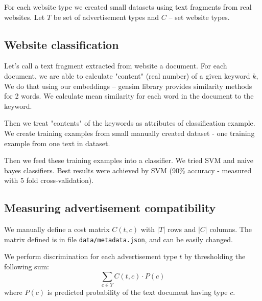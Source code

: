 \documentclass[a4paper]{article}
\begin{document}
For each website type we created small datasets using text fragments from real websites.
Let $T$ be set of advertisement types and $C$ -- set website types.


\subsection{Website classification}

Let's call a text fragment extracted from website a document.
For each document, we are able to calculate "content" (real number) of a given keyword $k$,
We do that using our embeddings -- gensim library provides similarity methods for 2 words.
We calculate mean similarity for each word in the document to the keyword.

Then we treat "contents" of the keywords as attributes of classification example.
We create training examples from small manually created dataset - one training example from one text in dataset.

Then we feed these training examples into a classifier.
We tried SVM and naive bayes classifiers.
Best results were achieved by SVM (90\% accuracy - measured with 5 fold cross-validation).


\subsection{Measuring advertisement compatibility}

We manually define a cost matrix $C(t, c)$ 
with $|T|$ rows and $|C|$ columns.
The matrix defined is in file \texttt{data/metadata.json},
and can be easily changed.

We perform discrimination for each advertisement type $t$
by thresholding the following sum:
\begin{equation}
    \sum_{c\in{Y}} {C(t, c) \cdot P(c)}
\end{equation}
where $P(c)$ is predicted probability of the text document having type $c$.
\end{document}
